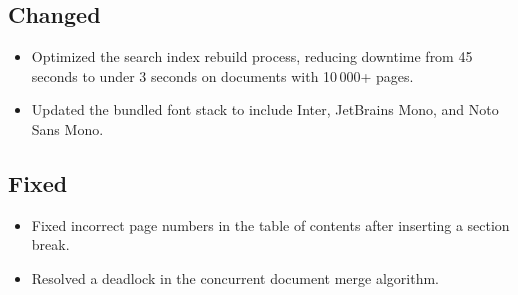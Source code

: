 \documentclass[
    language=english,
    doctype=article,
    institution=none,
]{../../omnilatex}
\begin{document}
\subsection{Changed}
\begin{itemize}
    \item Optimized the search index rebuild process, reducing downtime from
          45 seconds to under 3 seconds on documents with 10\,000+ pages.
    \item Updated the bundled font stack to include Inter, JetBrains Mono,
          and Noto Sans Mono.
\end{itemize}

\subsection{Fixed}
\begin{itemize}
    \item Fixed incorrect page numbers in the table of contents after
          inserting a section break.
    \item Resolved a deadlock in the concurrent document merge algorithm.
\end{itemize}

\printbibliography[heading=none]
\end{document}
